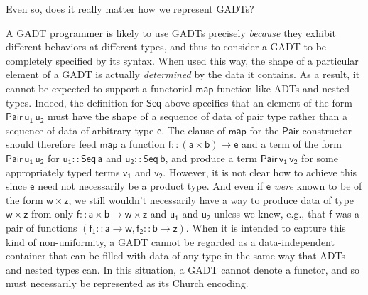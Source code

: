 \documentclass[submission,copyright,creativecommons]{eptcs}
\begin{document}
Even so, does it really matter how we represent GADTs?

A GADT programmer is likely to use GADTs precisely {\em because} they
exhibit different behaviors at different types, and thus to consider a
GADT to be completely specified by its syntax. When used this way, the
shape of a particular element of a GADT is actually {\em determined}
by the data it contains. As a result, it cannot be expected to support
a functorial $\mathsf{map}$ function like ADTs and nested
types. Indeed, the definition for $\mathsf{Seq}$ above specifies that
an element of the form $\mathsf{Pair\,u_1\,u_2}$ must have the shape
of a sequence of data of pair type rather than a sequence of data of
arbitrary type $\mathsf{e}$.  The clause of $\mathsf{map}$ for the
$\mathsf{Pair}$ constructor should therefore feed $\mathsf{map}$ a
function $\mathsf{f :: (a \times b) \to e}$ and a term of the form
$\mathsf{Pair \,u_1\,u_2}$ for $\mathsf{u_1 :: Seq\,a}$ and
$\mathsf{u_2 :: Seq\,b}$, and produce a term $\mathsf{Pair\,v_1\,v_2}$
for some appropriately typed terms $\mathsf{v_1}$ and
$\mathsf{v_2}$. However, it is not clear how to achieve this since
$\mathsf{e}$ need not necessarily be a product type. And even if
$\mathsf{e}$ {\em were} known to be of the form $\mathsf{w \times z}$,
we still wouldn't necessarily have a way to produce data of type
$\mathsf{w \times z}$ from only $\mathsf{f :: a \times b \to w \times
  z}$ and $\mathsf{u_1}$ and $\mathsf{u_2}$ unless we knew, e.g., that
$\mathsf{f}$ was a pair of functions $\mathsf{(f_1 :: a \to w, f_2 ::
  b \to z)}$. When it is intended to capture this kind of
non-uniformity, a GADT cannot be regarded as a data-independent
container that can be filled with data of any type in the same way
that ADTs and nested types can. In this situation, a GADT cannot
denote a functor, and so must necessarily be represented as its
Church encoding.
\end{document}
